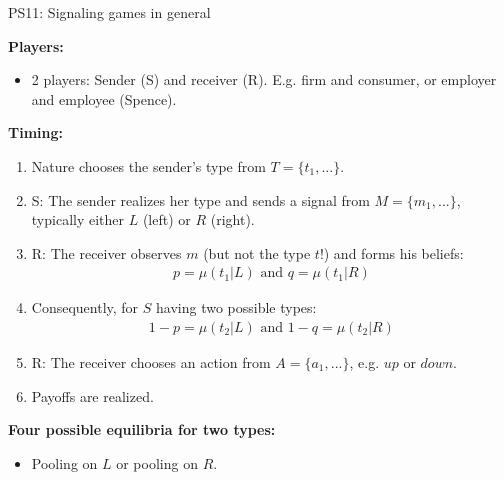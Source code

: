 




\begin{frame}{PS11: Signaling games in general}
    \begin{multicols}{2}
      \textbf{Players:}\vspace{-10pt}
      \begin{itemize}
        \item 2 players: Sender (S) and receiver (R). E.g. firm and consumer, or employer and employee (Spence).
      \end{itemize}\vspace{-8pt}
      \textbf{Timing:}\vspace{-10pt}
      \begin{enumerate}
        \item Nature chooses the sender's type from $T=\{t_1,...\}$.
        \item \vspace{-4pt} S: The sender realizes her type and sends a signal from $M=\{m_1,...\}$, typically either $L$ (left) or $R$ (right).
        \item \vspace{-4pt} R: The receiver observes $m$ (but not the type $t$!) and forms his beliefs:\vspace{-8pt}
        \begin{align*}
          p=\mu(t_1|L)\text{ and }q=\mu(t_1|R)
        \end{align*}
        \item[] \vspace{-8pt} Consequently, for $S$ having two possible types:\vspace{-8pt}
        \begin{align*}
          1-p=\mu(t_2|L)\text{ and }1-q=\mu(t_2|R)
        \end{align*}
        \item \vspace{-8pt} R: The receiver chooses an action from $A=\{a_1,...\}$, e.g. $up$ or $down$.
        \item \vspace{-4pt} Payoffs are realized.
      \end{enumerate}\vspace{-8pt}
      \textbf{Four possible equilibria for two types:}\vspace{-8pt}
      \begin{itemize}
        \item Pooling on $L$ or pooling on $R$.

\end{itemize}
\end{multicols}
\end{frame}
